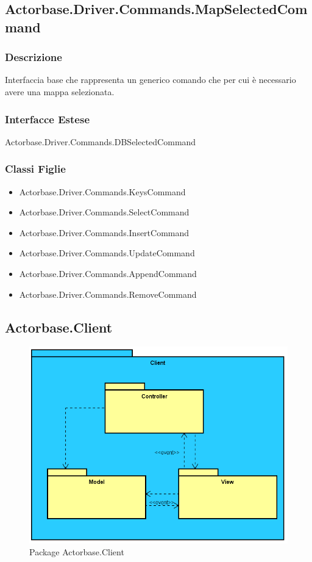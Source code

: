 \documentclass[a4paper]{article}
\begin{document}
		\subsection{Actorbase.Driver.Commands.MapSelectedCommand}
				\subsubsection{Descrizione} Interfaccia base che rappresenta un generico comando che per cui è necessario avere una mappa selezionata.
				\subsubsection{Interfacce Estese} Actorbase.Driver.Commands.DBSelectedCommand
				\subsubsection{Classi Figlie}
					\begin{itemize}
						\item Actorbase.Driver.Commands.KeysCommand
						\item Actorbase.Driver.Commands.SelectCommand
						\item Actorbase.Driver.Commands.InsertCommand
						\item Actorbase.Driver.Commands.UpdateCommand
						\item Actorbase.Driver.Commands.AppendCommand
						\item Actorbase.Driver.Commands.RemoveCommand
					\end{itemize}

	
	\subsection{Actorbase.Client}
		\begin{figure} [H]
			\centering
			\includegraphics[scale=0.5]{ST/Client/ClientPackage.png}
        	\caption{Package Actorbase.Client}
		\end{figure}
\end{document}
